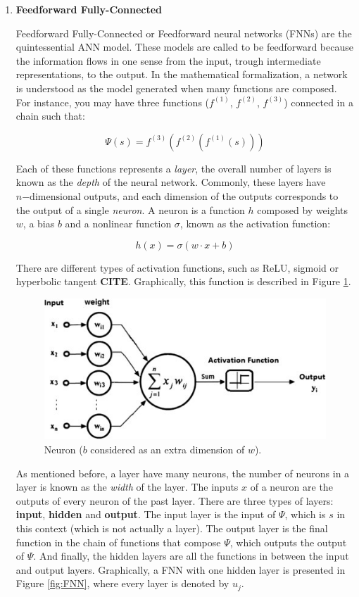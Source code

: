 \begin{enumerate}
    \item \textbf{Feedforward Fully-Connected} \newline
    
Feedforward Fully-Connected or Feedforward neural networks (FNNs) are the quintessential ANN model. These models are called to be feedforward because the information flows in one sense from the input, trough intermediate representations, to the output. In the mathematical formalization, a network is understood as the model generated when many functions are composed. For instance, you may have three functions ($f^{(1)}$, $f^{(2)}$, $f^{(3)}$) connected in a chain such that:

\begin{equation}
    \Psi(s) = f^{(3)}(f^{(2)}(f^{(1)}(s)))
\end{equation}

Each of these functions represents a \emph{layer}, the overall number of layers is known as the \emph{depth} of the neural network. Commonly, these layers have $n\mathrm{-dimensional}$ outputs, and each dimension of the outputs corresponds to the output of a single \emph{neuron}. A neuron is a function $h$ composed by weights $w$, a bias $b$ and a nonlinear function $\sigma$, known as the activation function:

\begin{equation}
    h(x) = \sigma(w \cdot x + b)
    \label{eq:h}
\end{equation}

There are different types of activation functions, such as ReLU, sigmoid or hyperbolic tangent \textbf{CITE}. Graphically, this function is described in Figure \ref{fig:neuron}.

\begin{figure}[H]
    \centering
    \includegraphics[width=0.6\linewidth]{imagenes/cap1/neuron.jpeg}
    \caption{Neuron ($b$ considered as an extra dimension of $w$).}
    \label{fig:neuron}
\end{figure}

As mentioned before, a layer have many neurons, the number of neurons in a layer is known as the \emph{width} of the layer. The inputs $x$ of a neuron are the outputs of every neuron of the past layer.  There are three types of layers: \textbf{input}, \textbf{hidden} and \textbf{output}. The input layer is the input of $\Psi$, which is $s$ in this context (which is not actually a layer). The output layer is the final function in the chain of functions that compose $\Psi$, which outputs the output of $\Psi$. And finally, the hidden layers are all the functions in between the input and output layers. Graphically, a FNN with one hidden layer is presented in Figure \ref{fig:FNN}, where every layer is denoted by $u_{j}$.


\end{enumerate}
